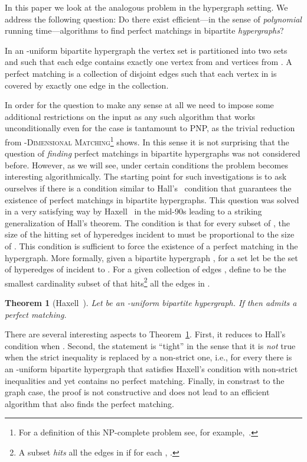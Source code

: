 \documentclass[11pt]{article}
\newtheorem{theorem}{Theorem}[section]
\theoremstyle{definition}
\theoremstyle{remark}
\newcommand{\problemmacro}[1]{\texorpdfstring{\textsc{#1}}{#1}\xspace}
\begin{document}
In this paper we look at the analogous problem in the hypergraph
setting. We address the following question: Do there exist
efficient---in the sense of \emph{polynomial} running time---algorithms
to find perfect matchings in bipartite \emph{hypergraphs}?

In an -uniform bipartite hypergraph the vertex set is partitioned
into two sets  and  such that each edge contains exactly one
vertex from  and  vertices from . A perfect matching is a
collection of disjoint edges such that each vertex in  is covered
by exactly one edge in the collection.

In order for the question to make any sense at all we need to impose
some additional restrictions on the input as any such algorithm that
works unconditionally even for the case  is tantamount to PNP,
as the trivial reduction from \problemmacro{-Dimensional
  Matching}\footnote{For a definition of this NP-complete problem see, for example,~\cite{cygan2013improved}.} shows. In this sense it is not surprising that the question of
\emph{finding} perfect matchings in bipartite hypergraphs was not
considered before. However, as we will see, under certain conditions
the problem becomes interesting algorithmically. The starting point
for such investigations is to ask ourselves if there is a condition
similar to Hall's~\cite{hall1935representatives} condition that
guarantees the existence of perfect matchings in bipartite
hypergraphs. This question was solved in a very satisfying way by
Haxell~\cite{haxell1995condition} in the mid-90s leading to a striking
generalization of Hall's theorem. The condition is that for every
subset  of , the size of the hitting set of hyperedges incident
to  must be proportional to the size of . This condition
is sufficient to force the existence of a perfect matching in the
hypergraph. More formally, given a bipartite hypergraph ,
for a set  let
 be the set of hyperedges of
 incident to . For a given collection of edges ,
define  to be the smallest cardinality subset of 
that hits\footnote{A subset  \emph{hits} all the edges
  in  if for each , .} all the
edges in .

\begin{theorem}[Haxell~\cite{haxell1995condition}]\label{thm:haxell}
  Let  be an -uniform bipartite hypergraph. If
   then  admits a perfect matching.
\end{theorem}

There are several interesting aspects to
Theorem~\ref{thm:haxell}. First, it reduces to Hall's condition when
. Second, the statement is ``tight'' in the sense that it is
\emph{not} true when the strict inequality is replaced by a non-strict
one, i.e., for every  there is an -uniform bipartite hypergraph
that satisfies Haxell's condition with non-strict inequalities and yet
contains no perfect matching. Finally, in constrast to the graph case,
the proof is not constructive and does not lead to an efficient
algorithm that also finds the perfect matching.
\end{document}
